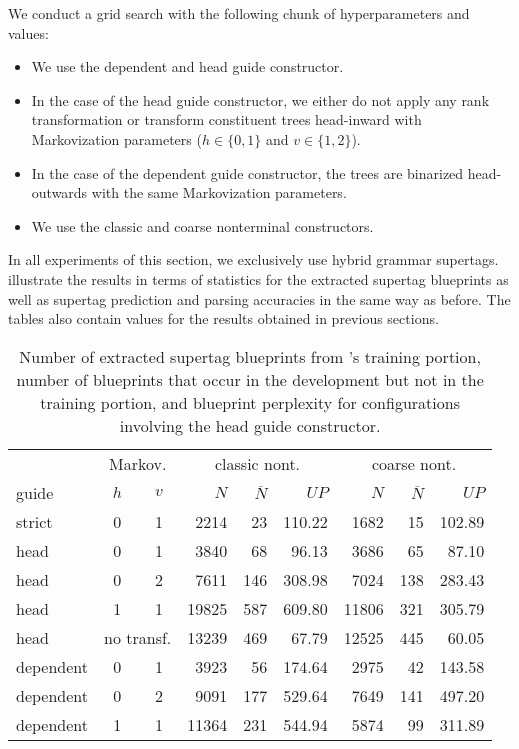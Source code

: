 \documentclass[../../document.tex]{subfiles}
\begin{document}
    We conduct a grid search with the following chunk of hyperparameters and values:
    \begin{itemize}
        \item We use the dependent and head guide constructor.
        \item In the case of the head guide constructor, we either do not apply any rank transformation or transform constituent trees head-inward with Markovization parameters ($h \in \{0,1\}$ and $v \in \{1,2\}$).
        \item In the case of the dependent guide constructor, the trees are binarized head-outwards with the same Markovization parameters.
        \item We use the classic and coarse nonterminal constructors.
    \end{itemize}
    In all experiments of this section, we exclusively use hybrid grammar supertags.
     illustrate the results in terms of statistics for the extracted supertag blueprints as well as supertag prediction and parsing accuracies in the same way as before.
    The tables also contain values for the results obtained in previous sections.

    \begin{table}
        \caption{\label{tbl:gridsearch:head:1}
        Number of extracted supertag blueprints from \negra{}'s training portion, number of blueprints that occur in the development but not in the training portion, and blueprint perplexity for configurations involving the head guide constructor.
        }
        \centering
        \vspace{.2cm}
        \begin{tabular}{lcc|rrr|rrr}
            \toprule
            & \multicolumn{2}{c|}{Markov.} & \multicolumn{3}{c|}{classic nont.} &  \multicolumn{3}{c}{coarse nont.} \\
guide      & \(h\) & \(v\) & $N$ & $\overline{N}$ & $\mathit{UP}$ & $N$ & $\overline{N}$ & $\mathit{UP}$  \\ \hline \rowcolor{black!10}
strict     & 0 & 1 & 2214 & 23 & 110.22 & 1682 & 15 & 102.89 \\\hline
head & 0 & 1 & 3840 & 68 & 96.13 & 3686 & 65 & 87.10 \\
head & 0 & 2 & 7611 & 146 & 308.98 & 7024 & 138 & 283.43 \\
head & 1 & 1 & 19825 & 587 & 609.80 & 11806 & 321 & 305.79 \\
head & \multicolumn{2}{c|}{no transf.}  & 13239 & 469 & 67.79 & 12525 & 445 & 60.05 \\ \hline
dependent & 0 & 1 & 3923 & 56 & 174.64 & 2975 & 42 & 143.58 \\
dependent & 0 & 2 & 9091 & 177 & 529.64 & 7649 & 141 & 497.20 \\
dependent & 1 & 1 & 11364 & 231 & 544.94 & 5874 & 99 & 311.89 \\
\bottomrule
        \end{tabular}
    \end{table}
\end{document}
